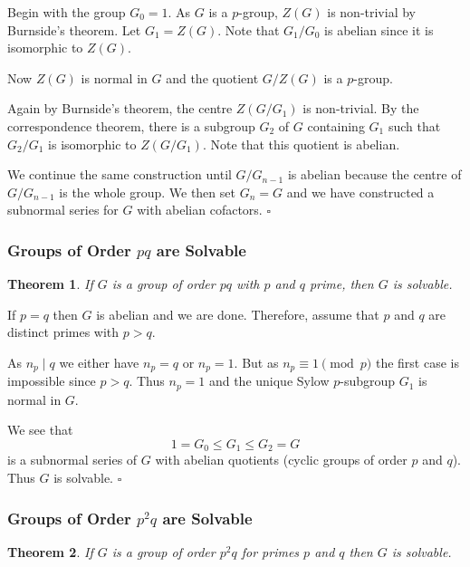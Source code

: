 \documentclass[10pt]{article}
\newtheorem{theorem}{Theorem}[section]
\newenvironment{proof}[1][Proof]{\begin{trivlist}
\item[\hskip \labelsep {\itshape #1}]}{\end{trivlist}}
\begin{document}
\begin{proof}
Begin with the group $G_0 = 1$. As $G$ is a $p$-group, $Z(G)$ is non-trivial by Burnside's theorem. Let $G_1 = Z(G)$. Note that $G_1/G_0$ is abelian since it is isomorphic to $Z(G)$.

Now $Z(G)$ is normal in $G$ and the quotient $G/Z(G)$ is a $p$-group.

Again by Burnside's theorem, the centre $Z(G/G_1)$ is non-trivial. By the correspondence theorem, there is a subgroup $G_2$ of $G$ containing $G_1$ such that $G_2/G_1$ is isomorphic to $Z(G/G_1)$. Note that this quotient is abelian.

We continue the same construction until $G/G_{n-1}$ is abelian because the centre of $G/G_{n-1}$ is the whole group. We then set $G_n = G$ and we have constructed a subnormal series for $G$ with abelian cofactors. $\square$
\end{proof}

\subsubsection{Groups of Order $pq$ are Solvable}

\begin{theorem}
If $G$ is a group of order $pq$ with $p$ and $q$ prime, then $G$ is solvable.
\end{theorem}

\begin{proof}
If $p = q$ then $G$ is abelian and we are done. Therefore, assume that $p$ and $q$ are distinct primes with $p > q$.

As $n_p \;|\; q$ we either have $n_p = q$ or $n_p = 1$. But as $n_p \equiv 1 \pmod{p}$ the first case is impossible since $p > q$. Thus $n_p = 1$ and the unique Sylow $p$-subgroup $G_1$ is normal in $G$.

We see that
$$1 = G_0 \leq G_1 \leq G_2 = G$$
is a subnormal series of $G$ with abelian quotients (cyclic groups of order $p$ and $q$). Thus $G$ is solvable. $\square$
\end{proof}

\subsubsection{Groups of Order $p^2q$ are Solvable}

\begin{theorem}
If $G$ is a group of order $p^2q$ for primes $p$ and $q$ then $G$ is solvable.
\end{theorem}
\end{document}
